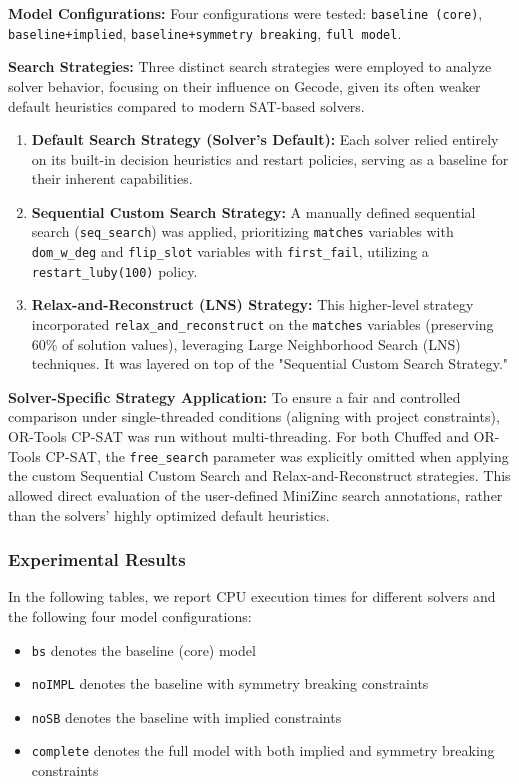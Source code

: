 \textbf{Model Configurations:}
Four configurations were tested: \texttt{baseline (core)}, \texttt{baseline+implied}, \texttt{baseline+symmetry breaking}, \texttt{full model}.

\textbf{Search Strategies:}
Three distinct search strategies were employed to analyze solver behavior, focusing on their influence on Gecode, given its often weaker default heuristics compared to modern SAT-based solvers.

\begin{enumerate}
    \item \textbf{Default Search Strategy (Solver's Default):} Each solver relied entirely on its built-in decision heuristics and restart policies, serving as a baseline for their inherent capabilities.

    \item \textbf{Sequential Custom Search Strategy:} A manually defined sequential search (\texttt{seq\_search}) was applied, prioritizing \texttt{matches} variables with \texttt{dom\_w\_deg} and \texttt{flip\_slot} variables with \texttt{first\_fail}, utilizing a \\ \texttt{restart\_luby(100)} policy.

    \item \textbf{Relax-and-Reconstruct (LNS) Strategy:} This higher-level strategy incorporated \texttt{relax\_and\_reconstruct} on the \texttt{matches} variables (preserving 60\% of solution values), leveraging Large Neighborhood Search (LNS) techniques. It was layered on top of the "Sequential Custom Search Strategy."
\end{enumerate}

\textbf{Solver-Specific Strategy Application:}
To ensure a fair and controlled comparison under single-threaded conditions (aligning with project constraints), OR-Tools CP-SAT was run without multi-threading. For both Chuffed and OR-Tools CP-SAT, the \texttt{free\_search} parameter was explicitly omitted when applying the custom Sequential Custom Search and Relax-and-Reconstruct strategies. This allowed direct evaluation of the user-defined MiniZinc search annotations, rather than the solvers' highly optimized default heuristics.


\subsubsection{Experimental Results}
In the following tables, we report CPU execution times for different solvers and the following four model configurations:
\begin{itemize}
    \item \texttt{bs} denotes the baseline (core) model
     \item  \texttt{noIMPL} denotes the baseline with symmetry breaking constraints
    \item \texttt{noSB} denotes the baseline with implied constraints
    \item \texttt{complete} denotes the full model with both implied and symmetry breaking constraints
\end{itemize}



